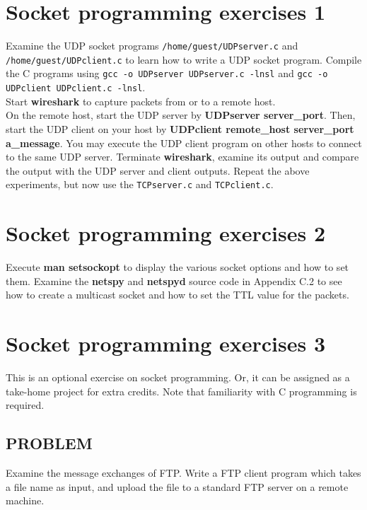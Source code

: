 \documentclass[10pt,a4paper]{article}
\numberwithin{equation}{section}
\numberwithin{figure}{section}
\numberwithin{table}{section}
\begin{document}
    \section*{Socket programming exercises 1}
    Examine the UDP socket programs \texttt{/home/guest/UDPserver.c} and \texttt{/home/guest/UDPclient.c} to learn how to write a UDP socket program.
    Compile the C programs using \texttt{gcc -o UDPserver UDPserver.c -lnsl} and \texttt{gcc -o UDPclient UDPclient.c -lnsl}. \\
    Start \textbf{wireshark} to capture packets from or to a remote host. \\
    On the remote host, start the UDP server by \textbf{UDPserver server\_port}.
    Then, start the UDP client on your host by \textbf{UDPclient remote\_host server\_port a\_message}.
    You may execute the UDP client program on other hosts to connect to the same UDP server.
    Terminate \textbf{wireshark}, examine its output and compare the output with the UDP server and client outputs.
    Repeat the above experiments, but now use the \texttt{TCPserver.c} and \texttt{TCPclient.c}.

    \section*{Socket programming exercises 2}
    Execute \textbf{man setsockopt} to display the various socket options and how to set them.
    Examine the \textbf{netspy} and \textbf{netspyd} source code in Appendix C.2 to see how to create a multicast socket and how to set the TTL value for the packets.

    \section*{Socket programming exercises 3}
    This is an optional exercise on socket programming.
    Or, it can be assigned as a take-home project for extra credits.
    Note that familiarity with C programming is required.
    \subsection*{PROBLEM}
    Examine the message exchanges of FTP. Write a FTP client program which takes a file name as input, and upload the file to a standard FTP server on a remote machine.
\end{document}
